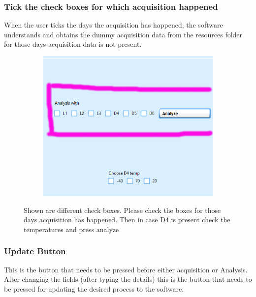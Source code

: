 \documentclass[12pt]{article}
\begin{document}
    
    
    
    \subsubsection{Tick the check boxes for which acquisition happened }
    When the user ticks the days the acquisition has happened, the software understands and obtains the dummy acquisition data from the resources folder for those days acquisition data is not present. 
    \begin{figure}[H]
 
    \begin{subfigure}{1.0\textwidth}
    \includegraphics[scale=0.5]{images/Analysis.png} 
    \label{fig:DJp1}
    \end{subfigure}
 
 \caption{Shown are different check boxes. Please check the boxes for those days acquisition has happened. Then in case D4 is present check the temperatures and press analyze}
\label{fig6}
\end{figure}
    
    
    
    
    \subsubsection{Update Button}
    This is the button that needs to be pressed before either acquisition or Analysis. After changing the fields (after typing the details) this is the button that needs to be pressed for updating the desired process to the software.
    
\end{document}
